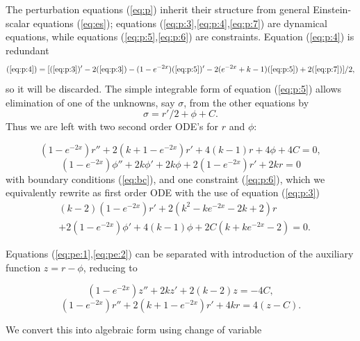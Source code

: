 The perturbation equations (\ref{eq:p}) inherit their structure from
general Einstein-scalar equations (\ref{eq:es}); equations
(\ref{eq:p:3},\ref{eq:p:4},\ref{eq:p:7}) are dynamical equations, while
equations (\ref{eq:p:5},\ref{eq:p:6}) are constraints. Equation
(\ref{eq:p:4}) is redundant
\begin{equation}
  (\ref{eq:p:4}) = [(\ref{eq:p:3})' - 2 (\ref{eq:p:3}) 
  - (1 - e^{-2x}) (\ref{eq:p:5})' - 2 (e^{-2x} + k - 1) (\ref{eq:p:5})
  + 2 (\ref{eq:p:7})]/2,
\end{equation}
so it will be discarded. The simple integrable form of equation
(\ref{eq:p:5}) allows elimination of one of the unknowns, say $\sigma$,
from the other equations by
\begin{equation} \label{eq:no_sigma}
  \sigma = r'/2 + \phi + C.
\end{equation}
Thus we are left with two second order ODE's for $r$ and $\phi$:
\begin{mathletters} \label{eq:pe}
\begin{equation} \label{eq:pe:1}
  (1 - e^{-2x}) r'' + 2 (k + 1 - e^{-2x}) r' + 4 (k - 1) r + 4 \phi + 4C = 0,
\end{equation}
\begin{equation} \label{eq:pe:2}
  (1 - e^{-2x}) \phi'' + 2k \phi' + 2k \phi + 2 (1 - e^{-2x}) r' + 2k r  = 0
\end{equation}
with boundary conditions (\ref{eq:bc}), and one constraint
(\ref{eq:p:6}), which we equivalently rewrite as first order ODE with
the use of equation (\ref{eq:p:3})
\begin{eqnarray} \label{eq:pe:c}
 &(k - 2)(1 - e^{-2x}) r' + 2 (k^2 - k e^{-2x} - 2k + 2) r \nonumber\\
 & + 2 (1 - e^{-2x}) \phi' + 4 (k - 1) \phi + 2C (k + k e^{-2x} - 2) = 0.
\end{eqnarray}
\end{mathletters}
Equations (\ref{eq:pe:1},\ref{eq:pe:2}) can be separated with
introduction of the auxiliary function $z=r-\phi$, reducing to
\begin{mathletters} \label{eq:se}
\begin{equation} \label{eq:se:1}
  (1 - e^{-2x}) z'' + 2 k z' + 2 (k-2) z = -4 C,
\end{equation}
\begin{equation} \label{eq:se:2}
  (1 - e^{-2x}) r'' + 2 (k + 1 - e^{-2x}) r' + 4k r = 4 (z - C).
\end{equation}
\end{mathletters}
We convert this into algebraic form using change of variable

